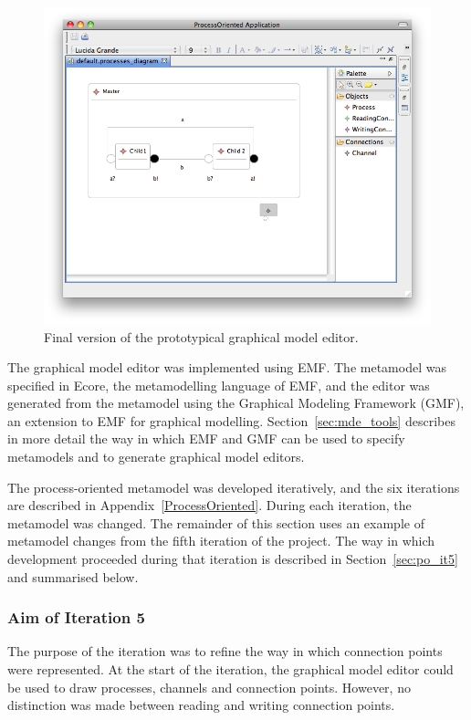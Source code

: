 \begin{figure}[htbp]
	\centering
	\includegraphics[width=13.5cm]{6.Evaluation/images/user_driven/po_final_editor.png}
	\caption{Final version of the prototypical graphical model editor.}
	\label{fig:po_final_graphical_editor}
\end{figure}

The graphical model editor was implemented using EMF. The metamodel was specified in Ecore, the metamodelling language of EMF, and the editor was generated from the metamodel using the Graphical Modeling Framework (GMF), an extension to EMF for graphical modelling. Section~\ref{sec:mde_tools} describes in more detail the way in which EMF and GMF can be used to specify metamodels and to generate graphical model editors.

The process-oriented metamodel was developed iteratively, and the six iterations are described in Appendix~\ref{ProcessOriented}. During each iteration, the metamodel was changed. The remainder of this section uses an example of metamodel changes from the fifth iteration of the project. The way in which development proceeded during that iteration is described in Section~\ref{sec:po_it5} and summarised below.

\subsubsection{Aim of Iteration 5}
The purpose of the iteration was to refine the way in which connection points were represented. At the start of the iteration, the graphical model editor could be used to draw processes, channels and connection points. However, no distinction was made between reading and writing connection points.

